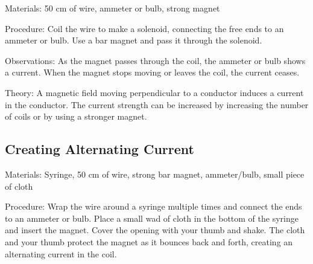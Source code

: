 \begin{multicols}{2}

\begin{description*}
\item[Materials:]{50 cm of wire, ammeter or bulb, strong magnet}
\item[Procedure:]{Coil the wire to make a solenoid, connecting the free ends to an ammeter or bulb. Use a bar magnet and pass it through the solenoid.}
\item[Observations:]{As the magnet passes through the coil, the ammeter or bulb shows a current. When the magnet stops moving or leaves the coil, the current ceases.}
\item[Theory:]{A magnetic field moving perpendicular to a conductor induces a current in the conductor. The current strength can be increased by increasing the number of coils or by using a stronger magnet.}
\end{description*}

\subsection{Creating Alternating Current}


\begin{description*}
\item[Materials:]{Syringe, 50 cm of wire, strong bar magnet, ammeter/bulb, small piece of cloth}
\item[Procedure:]{Wrap the wire around a syringe multiple times and connect the ends to an ammeter or bulb. Place a small wad of cloth in the bottom of the syringe and insert the magnet. Cover the opening with your thumb and shake. The cloth and your thumb protect the magnet as it bounces back and forth, creating an alternating current in the coil.}
\end{description*}


\end{multicols}
